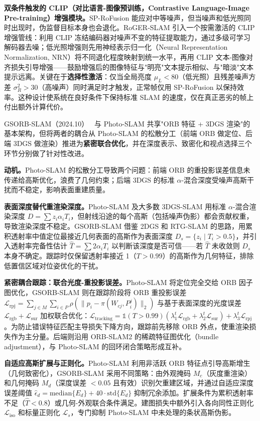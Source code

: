 \textbf{双条件触发的 CLIP（对比语言-图像预训练，Contrastive Language-Image Pre-training）增强模块。}SP-RoFusion 能应对中等噪声，但当噪声和低光照同时出现时，伪监督目标本身也会退化。RoGER-SLAM 引入一个按需激活的 CLIP 增强管线：利用 CLIP 冻结编码器对噪声不变的特征提取能力，通过多级可学习解码器去噪；低光照增强则先用神经表示归一化（Neural Representation Normalization, NRN）将不同退化程度映射到统一水平，再用 CLIP 文本-图像对齐损失引导增强——鼓励增强后的图像特征与"明亮"文本提示相似、与"暗淡"文本提示远离。关键在于\textbf{选择性激活}：仅当全局亮度 $\mu_L < 80$（低光照）且残差噪声方差 $\sigma_R^2 > 30$（高噪声）同时满足时才触发，正常帧仅用 SP-RoFusion 以保持效率。这种设计使系统在良好条件下保持标准 SLAM 的速度，仅在真正恶劣的帧上付出额外计算代价。

GSORB-SLAM（2024.10）~\cite{2410_11356} 与 Photo-SLAM 共享"ORB 特征 + 3DGS 渲染"的基本架构，但将两者的耦合从 Photo-SLAM 的松散分工（前端 ORB 做定位、后端 3DGS 做渲染）推进为\textbf{紧密联合优化}，并在深度表示、致密化和视点选择三个环节分别做了针对性改进。

\textbf{动机。}Photo-SLAM 的松散分工导致两个问题：前端 ORB 的重投影误差信息未传递给高斯优化，浪费了几何约束；后端 3DGS 的标准 $\alpha$-混合深度受噪声高斯干扰而不稳定，影响表面重建质量。

\textbf{表面深度替代重渲染深度。}Photo-SLAM 及大多数 3DGS-SLAM 用标准 $\alpha$-混合渲染深度 $D = \sum z_i \alpha_i T_i$，但射线沿途的每个高斯（包括噪声伪影）都会贡献权重，导致渲染深度不稳定。GSORB-SLAM 借鉴 2DGS 和 RTG-SLAM 的思路，用累积透射率中值定位最接近几何表面的高斯作为表面深度 $D_s = \{z_i \mid T_i > 0.5\}$，并引入透射率完备性估计 $\hat{T} = \sum 2\alpha_i T_i$ 以判断该深度是否可信——若 $\hat{T}$ 未收敛则 $D_s$ 本身不确定。跟踪时仅保留透射率接近 1（$T > 0.99$）的高斯作为几何特征，排除低置信区域对位姿优化的干扰。

\textbf{紧密耦合跟踪：联合光度-重投影误差。}Photo-SLAM 将定位完全交给 ORB 因子图优化，GSORB-SLAM 则在跟踪阶段将 ORB 重投影误差 $\mathcal{L}_{\text{rpj}} = \sum_{j \in M}\sum_{i \in P}\rho(\|p_i - \pi(W_{cj}, P^j_i)\|_2)$ 与基于表面深度的光度误差 $\mathcal{L}_{\text{rgb}} + \mathcal{L}_{\text{sur}}$ 加权联合优化：$\mathcal{L}_{\text{tracking}} = \mathbb{1}(T > 0.99)(\lambda_1^t \mathcal{L}_{\text{rgb}} + \lambda_2^t \mathcal{L}_{\text{sur}}) + \lambda_3^t \mathcal{L}_{\text{rpj}}$。为防止错误特征匹配主导损失下降方向，跟踪前先移除 ORB 外点，使重渲染损失作为主分量。后端则沿用 ORB-SLAM2 的稀疏特征图优化（bundle adjustment），与 Photo-SLAM 的回环闭合策略形成互补。

\textbf{自适应高斯扩展与正则化。}Photo-SLAM 利用非活跃 ORB 特征点引导高斯增生（几何致密化），GSORB-SLAM 采用不同策略：由外观掩码 $M_c$（灰度重渲染）和几何掩码 $M_d$（深度误差 $< 0.05$ 且有效）识别欠重建区域，并通过自适应深度误差阈值 $\hat{\epsilon}_d = \text{median}\{E_d\} + 40 \cdot \text{std}\{E_d\}$ 抑制冗余添加。扩展条件为累积透射率不足（$\hat{T} < 0.8$）或几何-外观联合条件满足。建图损失中额外引入各向同性正则化 $\mathcal{L}_{\text{iso}}$ 和标量正则化 $\mathcal{L}_s$，专门抑制 Photo-SLAM 中未处理的条状高斯伪影。


